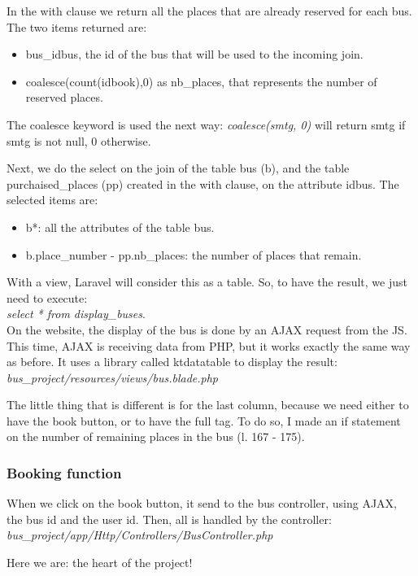 \documentclass[12pt,a4paper,openany]{book}
\begin{document}
In the with clause we return all the places that are already reserved for each bus. The two items returned are:
\begin{itemize}
	\item bus\_idbus, the id of the bus that will be used to the incoming join.
	\item coalesce(count(idbook),0) as nb\_places, that represents the number of reserved places.
\end{itemize}
\begin{remarque}
	The coalesce keyword is used the next way:
	\emph{coalesce(smtg, 0)} will return smtg if smtg is not null, 0 otherwise.
\end{remarque}
Next, we do the select on the join of the table bus (b), and the table purchaised\_places (pp) created in the with clause, on the attribute idbus. The selected items are:
\begin{itemize}
	\item b*: all the attributes of the table bus.
	\item b.place\_number - pp.nb\_places: the number of places that remain.
\end{itemize}
With a view, Laravel will consider this as a table. So, to have the result, we just need to execute:\\
\emph{select * from display\_buses}.\\

On the website, the display of the bus is done by an AJAX request from the JS. This time, AJAX is receiving data from PHP, but it works exactly the same way as before. It uses a library called ktdatatable to display the result:\\
\emph{bus\_project/resources/views/bus.blade.php}

\bigskip
The little thing that is different is for the last column, because we need either to have the book button, or to have the full tag. To do so, I made an if statement on the number of remaining places in the bus (l. 167 - 175).

\subsubsection{Booking function}
When we click on the book button, it send to the bus controller, using AJAX, the bus id and the user id. Then, all is handled by the controller:
\emph{bus\_project/app/Http/Controllers/BusController.php}

\bigskip
\hspace*{0.6cm}Here we are: the heart of the project!\\
\end{document}
